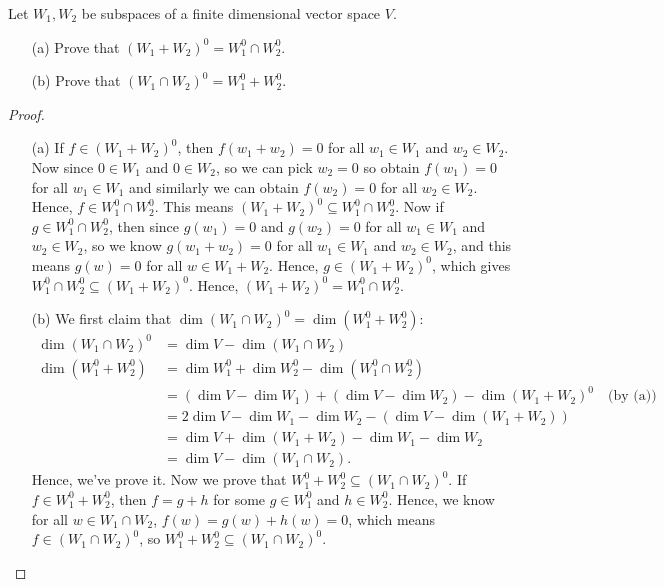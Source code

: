 \begin{problem}
    Let \(W_1, W_2\) be subspaces of a finite dimensional vector space \(V\). 
    \begin{itemize}
        \item [(a)] Prove that \((W_1 + W_2)^0 = W_1^0 \cap W_2^0\). 
        \item [(b)] Prove that \(\left( W_1 \cap W_2 \right)^0 = W_1^0 + W_2^0 \). 
    \end{itemize}  
\end{problem}
\begin{proof}
    \vphantom{text}
    \begin{itemize}
        \item [(a)] If \(f \in (W_1 + W_2)^0\), then \(f(w_1 + w_2) = 0\) for all \(w_1 \in W_1\) and \(w_2 \in W_2\). Now since \(0 \in W_1\) and \(0 \in W_2\), so we can pick \(w_2 = 0\) so obtain \(f(w_1) = 0\) for all \(w_1 \in W_1\) and similarly we can obtain \(f(w_2) = 0\) for all \(w_2 \in W_2\). Hence, \(f \in W_1^0 \cap W_2^0\). This means \((W_1 + W_2)^0 \subseteq W_1^0 \cap W_2^0\). Now if \(g \in W_1^0 \cap W_2^0\), then since \(g(w_1) = 0\) and \(g(w_2) = 0\) for all \(w_1 \in W_1\) and \(w_2 \in W_2\), so we know \(g(w_1 + w_2) = 0\) for all \(w_1 \in W_1\) and \(w_2 \in W_2\), and this means \(g(w) = 0\) for all \(w \in W_1 + W_2\). Hence, \(g \in (W_1 + W_2)^0\), which gives \(W_1^0 \cap W_2^0 \subseteq (W_1 + W_2)^0\). Hence, \((W_1 + W_2)^0 = W_1^0 \cap W_2^0\).                       
        \item [(b)] We first claim that \(\dim (W_1 \cap W_2)^0 = \dim \left( W_1^0 + W_2^0 \right) \):
        \begin{align*}
            \dim \left( W_1 \cap W_2 \right)^0 &= \dim V - \dim (W_1 \cap W_2) \\
            \dim \left( W_1^0 + W_2^0 \right) &= \dim W_1^0 + \dim W_2^0 - \dim \left( W_1^0 \cap W_2^0 \right) \\
            &= \left( \dim V - \dim W_1 \right) + \left( \dim V - \dim W_2 \right) - \dim \left( W_1 + W_2 \right)^0 \quad \text{(by (a))} \\
            &= 2 \dim V - \dim W_1 - \dim W_2 - \left( \dim V - \dim (W_1 + W_2) \right) \\
            &= \dim V + \dim (W_1 + W_2) - \dim W_1 - \dim W_2 \\
            &= \dim V - \dim (W_1 \cap W_2). 
        \end{align*}
        Hence, we've prove it. Now we prove that \(W_1^0 + W_2^0 \subseteq \left( W_1 \cap W_2 \right)^0 \). If \(f \in W_1^0 + W_2^0\), then \(f = g + h\) for some \(g \in W_1^0\) and \(h \in W_2^0\). Hence, we know for all \(w \in W_1 \cap W_2\), \(f(w) = g(w) + h(w) = 0\), which means \(f \in \left( W_1 \cap W_2 \right)^0 \), so \(W_1^0 + W_2^0 \subseteq (W_1 \cap W_2)^0\). 
        

\end{itemize}
\end{proof}
